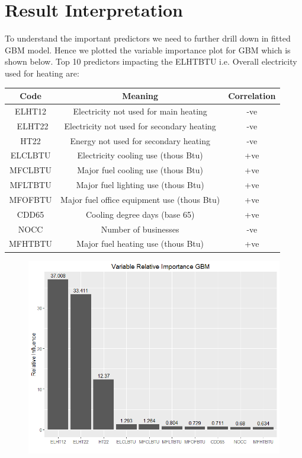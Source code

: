 \documentclass[letterpaper,12pt]{article}
\begin{document}
\section{Result Interpretation}
To understand the important predictors we need to further drill down in fitted GBM model. Hence we plotted the variable importance plot for GBM which is shown below. Top 10 predictors impacting the ELHTBTU i.e. Overall electricity used for heating are:

\begin{table} [H]
\centering 
\begin{tabular}{c c c} 
\hline 
Code & Meaning & Correlation \\\hline 
ELHT12 & Electricity not used for main heating & -ve\\\
ELHT22 & Electricity not used for secondary heating & -ve\\
HT22 & Energy not used for secondary heating & -ve\\
ELCLBTU & Electricity cooling use (thous Btu) & +ve\\
MFCLBTU & Major fuel cooling use (thous Btu) & +ve\\
MFLTBTU & Major fuel lighting use (thous Btu) & +ve\\
MFOFBTU & Major fuel office equipment use (thous Btu) & +ve \\
CDD65 & Cooling degree days (base 65) & +ve \\
NOCC & Number of businesses & -ve\\
MFHTBTU & Major fuel heating use (thous Btu) & +ve\\\hline 
\end{tabular} 
\end{table} 

\begin{figure}[H] 
        \centering \includegraphics[width=0.75\columnwidth]{gbmvar.png}
\end{figure}
\end{document}
